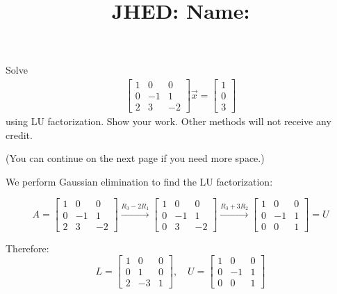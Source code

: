 \documentclass[reqno]{exam}
\title{\normalsize{
  JHED: \underline{\hspace{4cm}} \hspace{1em} Name: \underline{\hspace{9cm}}}
   }
\author{}
\date{}
\begin{document}
\maketitle
\vspace{-2cm} %

\begin{questions}

  \question[15] Solve 
  \begin{align*}
    \begin{bmatrix} 1 & 0 & 0 \\ 0 & -1 & 1 \\ 2 & 3 & -2 \end{bmatrix} \vec{x} = \begin{bmatrix} 1 \\ 0 \\ 3 \end{bmatrix}
  \end{align*}
  using LU factorization. Show your work. Other methods will not receive any credit.

  (You can continue on the next page if you need more space.)
  \begin{solution}
    We perform Gaussian elimination to find the LU factorization:
    
    $$A = \begin{bmatrix} 1 & 0 & 0 \\ 0 & -1 & 1 \\ 2 & 3 & -2 \end{bmatrix} \xrightarrow{R_3 - 2R_1} \begin{bmatrix} 1 & 0 & 0 \\ 0 & -1 & 1 \\ 0 & 3 & -2 \end{bmatrix} \xrightarrow{R_3 + 3R_2} \begin{bmatrix} 1 & 0 & 0 \\ 0 & -1 & 1 \\ 0 & 0 & 1 \end{bmatrix} = U$$

    Therefore:
    $$L = \begin{bmatrix} 1 & 0 & 0 \\ 0 & 1 & 0 \\ 2 & -3 & 1 \end{bmatrix}, \quad U = \begin{bmatrix} 1 & 0 & 0 \\ 0 & -1 & 1 \\ 0 & 0 & 1 \end{bmatrix}$$


\end{solution}
\end{questions}
\end{document}
